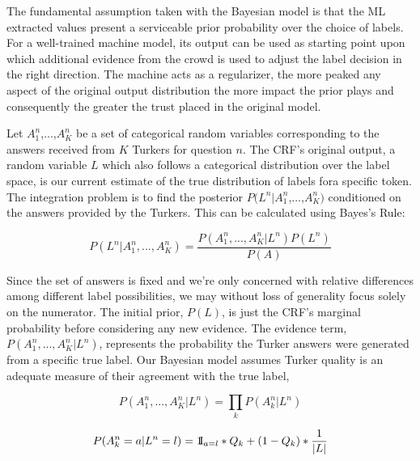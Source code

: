 The fundamental assumption taken with the Bayesian model is that the ML extracted values present a serviceable prior probability over the choice of labels.  For a well-trained machine model, its output can be used as starting point upon which additional evidence from the crowd is used to adjust the label decision in the right direction. The machine acts as a regularizer, the more peaked any aspect of the original output distribution the more impact the prior plays and consequently the greater the trust placed in the original model.

Let $A^{n}_{1}$,...,$A^{n}_{K}$ be a set of categorical random variables corresponding to the answers received from $K$ Turkers for question $n$.  The CRF's original output, a random variable $L$ which also follows a categorical distribution over the label space, is our current estimate of the true distribution of labels fora specific token.  The integration problem is to find the posterior $P(L^{n}|A^{n}_{1}$,...,$A^{n}_{K})$ conditioned on the answers provided by the Turkers.  This can be calculated using Bayes's Rule:     

\begin{equation}
P(L^{n}|A^{n}_{1},...,A^{n}_{K}) = \frac{P(A^{n}_{1},...,A^{n}_{K}|L^{n})P(L^{n})}{P(A)}
\end{equation}

Since the set of answers is fixed and we're only concerned with relative differences among different label possibilities, we may without loss of generality focus solely on the numerator.  The initial prior, $P(L)$, is just the CRF's marginal probability before considering any new evidence.  The evidence term, $P(A^{n}_{1},...,A^{n}_{K}|L^{n})$, represents the probability the Turker answers were generated from a specific true label.  Our Bayesian model assumes Turker quality is an adequate measure of their agreement with the true label,

\begin{equation}
\label{eq:independence}
P(A^{n}_{1},...,A^{n}_{K}|L^{n}) = \prod_{k}P(A^{n}_{k}|L^{n})
\end{equation}

\begin{equation}
\label{eq:bayes_evidence}
P(A^{n}_{k}=a|L^{n}=l) = 1{\hskip -2.5 pt}\hbox{I}_{{a}= l}* Q_{k} + (1-Q_{k})*\frac{1}{|L|}
\end{equation}

